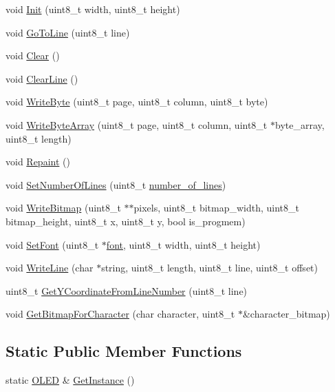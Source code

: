 \begin{DoxyCompactItemize}
\item 
void \hyperlink{class_o_l_e_d_a2c8205c8eac9d7a2b181657561e9b4d2}{Init} (uint8\+\_\+t width, uint8\+\_\+t height)
\item 
void \hyperlink{class_o_l_e_d_a8d314130676b104ed959b92ab4bac25e}{Go\+To\+Line} (uint8\+\_\+t line)
\item 
void \hyperlink{class_o_l_e_d_a6c7bb1fc91b3e574a275f90643da140a}{Clear} ()
\item 
void \hyperlink{class_o_l_e_d_a3a571f5ea7a183fa14932cd5b2c423eb}{Clear\+Line} ()
\item 
void \hyperlink{class_o_l_e_d_a7fa307269dbd2e80a6e48a1442df83d2}{Write\+Byte} (uint8\+\_\+t page, uint8\+\_\+t column, uint8\+\_\+t byte)
\item 
void \hyperlink{class_o_l_e_d_a7fffc17a5439300d361414c15a7a2dbe}{Write\+Byte\+Array} (uint8\+\_\+t page, uint8\+\_\+t column, uint8\+\_\+t $\ast$byte\+\_\+array, uint8\+\_\+t length)
\item 
void \hyperlink{class_o_l_e_d_a3efa34861b4ae0bc5323f6b7cf1d8a01}{Repaint} ()
\item 
void \hyperlink{class_o_l_e_d_aa3c88e19f05340036ea5ac9e2d1ea5dc}{Set\+Number\+Of\+Lines} (uint8\+\_\+t \hyperlink{class_o_l_e_d_a9ea1c55112deede1a61142af276a6bc9}{number\+\_\+of\+\_\+lines})
\item 
void \hyperlink{class_o_l_e_d_a3cb468f16387343f6db387a86cded8af}{Write\+Bitmap} (uint8\+\_\+t $\ast$$\ast$pixels, uint8\+\_\+t bitmap\+\_\+width, uint8\+\_\+t bitmap\+\_\+height, uint8\+\_\+t x, uint8\+\_\+t y, bool is\+\_\+progmem)
\item 
void \hyperlink{class_o_l_e_d_abe6073c961cadc4c9b693eb8dc8198bd}{Set\+Font} (uint8\+\_\+t $\ast$\hyperlink{class_o_l_e_d_a29ab86a4a73f4d343bf1810927f0911d}{font}, uint8\+\_\+t width, uint8\+\_\+t height)
\item 
void \hyperlink{class_o_l_e_d_a0ffccb4fd874b997c869c5d511f76df8}{Write\+Line} (char $\ast$string, uint8\+\_\+t length, uint8\+\_\+t line, uint8\+\_\+t offset)
\item 
uint8\+\_\+t \hyperlink{class_o_l_e_d_a5b6d41d5d699998f54ea6e3b6562ac5b}{Get\+Y\+Coordinate\+From\+Line\+Number} (uint8\+\_\+t line)
\item 
void \hyperlink{class_o_l_e_d_a3bd2f2f05568441e1e0533eaf0db58f8}{Get\+Bitmap\+For\+Character} (char character, uint8\+\_\+t $\ast$\&character\+\_\+bitmap)
\end{DoxyCompactItemize}
\subsection*{Static Public Member Functions}
\begin{DoxyCompactItemize}
\item 
static \hyperlink{class_o_l_e_d}{O\+L\+ED} \& \hyperlink{class_o_l_e_d_a7b261492679b5e67d346e97ed575332e}{Get\+Instance} ()
\end{DoxyCompactItemize}
